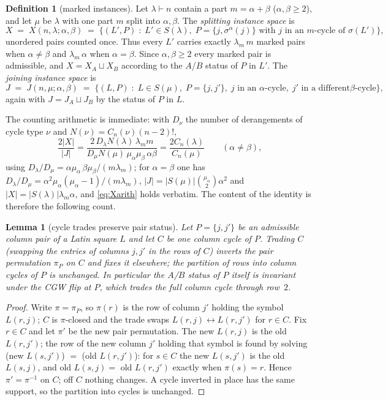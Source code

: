 \documentclass[11pt]{article}
\newtheorem{lemma}[theorem]{Lemma}
\theoremstyle{definition}
\newtheorem{definition}[theorem]{Definition}
\newcommand{\CC}{C}
\begin{document}
\begin{definition}[marked instances]\label{def:marked}
Let $\lambda\vdash n$ contain a part $m=\alpha+\beta$
($\alpha,\beta\ge2$), and let $\mu$ be $\lambda$ with one part $m$
split into $\alpha,\beta$.  The \emph{splitting instance space} is
\[
X \;=\; X(n,\lambda;\alpha,\beta)
\;=\;\bigl\{(L',P)\;:\;L'\in S(\lambda),\;
P=\{j,\sigma^\alpha(j)\}\text{ with } j\text{ in an $m$-cycle of }
\sigma(L')\bigr\},
\]
unordered pairs counted once.  Thus every $L'$ carries exactly
$\lambda_m\, m$ marked pairs when $\alpha\neq\beta$ and
$\lambda_m\,\alpha$ when $\alpha=\beta$.  Since $\alpha,\beta\ge 2$
every marked pair is admissible, and $X=X_A\sqcup X_B$ according to the
$A$/$B$ status of $P$ in $L'$.  The \emph{joining instance space} is
\[
J \;=\; J(n,\mu;\alpha,\beta)
\;=\;\bigl\{(L,P)\;:\;L\in S(\mu),\;P=\{j,j'\},\;
j\text{ in an $\alpha$-cycle},\; j'\text{ in a different
$\beta$-cycle}\bigr\},
\]
again with $J=J_A\sqcup J_B$ by the status of $P$ in $L$.
\end{definition}

The counting arithmetic is immediate: with
$D_\nu$ the number of derangements of cycle type $\nu$ and
$N(\nu)=\CC_n(\nu)(n-2)!$,
\begin{equation}\label{eq:Xarith}
\frac{2|X|}{|J|}
=\frac{2\,D_\lambda N(\lambda)\,\lambda_m m}
       {D_\mu N(\mu)\,\mu_\alpha\mu_\beta\,\alpha\beta}
=\frac{2\CC_n(\lambda)}{\CC_n(\mu)}
\qquad(\alpha\neq\beta),
\end{equation}
using $D_\lambda/D_\mu=\alpha\mu_\alpha\,\beta\mu_\beta/(m\lambda_m)$;
for $\alpha=\beta$ one has
$D_\lambda/D_\mu=\alpha^2\mu_\alpha(\mu_\alpha-1)/(m\lambda_m)$,
$|J|=|S(\mu)|\binom{\mu_\alpha}{2}\alpha^2$ and
$|X|=|S(\lambda)|\lambda_m\alpha$, and \eqref{eq:Xarith} holds
verbatim.  The content of the identity is therefore the following
count.

\begin{lemma}[cycle trades preserve pair status]\label{lem:cycletrade}
Let $P=\{j,j'\}$ be an admissible column pair of a Latin square $L$ and
let $C$ be one column cycle of $P$.  Trading $C$ (swapping the entries
of columns $j,j'$ in the rows of $C$) inverts the pair permutation
$\pi_P$ on $C$ and fixes it elsewhere; the partition of rows into
column cycles of $P$ is unchanged.  In particular the $A$/$B$ status of
$P$ itself is invariant under the CGW flip at $P$, which trades the
full column cycle through row~$2$.
\end{lemma}

\begin{proof}
Write $\pi=\pi_P$, so $\pi(r)$ is the row of column $j'$ holding the
symbol $L(r,j)$; $C$ is $\pi$-closed and the trade swaps
$L(r,j)\leftrightarrow L(r,j')$ for $r\in C$.  Fix $r\in C$ and let
$\pi'$ be the new pair permutation.  The new $L(r,j)$ is the old
$L(r,j')$; the row of the new column $j'$ holding that symbol is found
by solving (new $L(s,j')$) $=$ (old $L(r,j')$): for $s\in C$ the new
$L(s,j')$ is the old $L(s,j)$, and old $L(s,j)=$ old $L(r,j')$ exactly
when $\pi(s)=r$.  Hence $\pi'=\pi^{-1}$ on $C$; off $C$ nothing
changes.  A cycle inverted in place has the same support, so the
partition into cycles is unchanged.
\end{proof}
\end{document}
